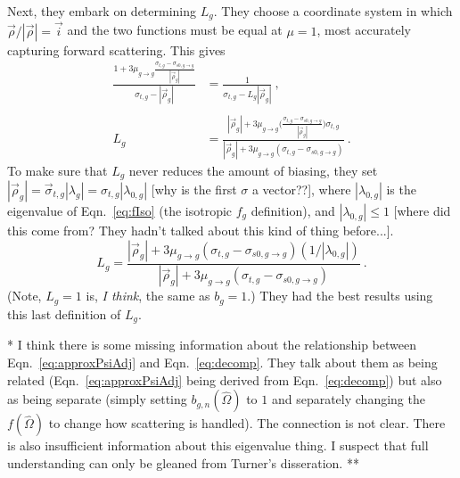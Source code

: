 \documentclass[12pt,twoside]{article}
\newcommand{\vOmega}{\ensuremath{\hat{\Omega}}}
\begin{document}
Next, they embark on determining $L_g$. They choose a coordinate system in which $\vec{\rho}/|\vec{\rho}| = \vec{i}$ and the two functions must be equal at $\mu=1$, most accurately capturing forward scattering. This gives
\begin{align}
  \frac{1 + 3 \mu_{g \rightarrow g}\frac{\sigma_{t,g} - \sigma_{s0,g \rightarrow g}}{|\vec{\rho}_{g}|}}{\sigma_{t,g} - |\vec{\rho}_{g}|} 
&= \frac{1}{\sigma_{t,g} - L_g|\vec{\rho}_{g}|} \:, \\
   \nonumber \\
   L_g &= \frac{|\vec{\rho}_{g}| + 3 \mu_{g \rightarrow g} \bigl( \frac{\sigma_{t,g} - \sigma_{s0,g \rightarrow g}}{|\vec{\rho}_{g}|}\bigr)\sigma_{t,g}}{|\vec{\rho}_{g}| + 3 \mu_{g \rightarrow g}(\sigma_{t,g} - \sigma_{s0,g \rightarrow g})} \:.
\end{align} 
To make sure that $L_g$ never reduces the amount of biasing, they set $|\vec{\rho}_{g}| = \vec{\sigma}_{t,g} |\lambda_{g}| = \sigma_{t,g}|\lambda_{0,g}|$ [why is the first $\sigma$ a vector??], where $|\lambda_{0,g}|$ is the eigenvalue of Eqn.~\eqref{eq:fIso} (the isotropic $f_g$ definition), and $|\lambda_{0,g}| \leq 1$ [where did this come from? They hadn't talked about this kind of thing before...].
\begin{equation}
  L_g = \frac{|\vec{\rho}_{g}| + 3 \mu_{g \rightarrow g}(\sigma_{t,g} - \sigma_{s0,g \rightarrow g})(1/|\lambda_{0,g}|)}{|\vec{\rho}_{g}| + 3 \mu_{g \rightarrow g}(\sigma_{t,g} - \sigma_{s0,g \rightarrow g})} \:.
\end{equation} 
(Note, $L_g = 1$ is, \textit{I think}, the same as $b_g = 1$.) They had the best results using this last definition of $L_g$. 

\vspace*{1em}
\noindent ** I think there is some missing information about the relationship between Eqn.~\eqref{eq:approxPsiAdj} and Eqn.~\eqref{eq:decomp}. They talk about them as being related (Eqn.~\eqref{eq:approxPsiAdj} being derived from Eqn.~\eqref{eq:decomp}) but also as being separate (simply setting $b_{g,n}(\vOmega)$ to $1$ and separately changing the $f(\vOmega)$ to change how scattering is handled). The connection is not clear. There is also insufficient information about this eigenvalue thing. I suspect that full understanding can only be gleaned from Turner's disseration. **
\vspace*{1em}
\end{document}
